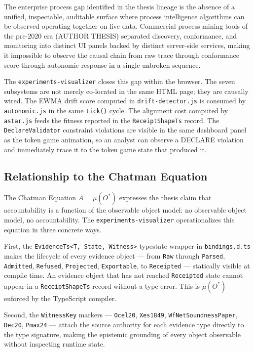The enterprise process gap identified in the thesis lineage is the absence of a unified,
inspectable, auditable surface where process intelligence algorithms can be observed operating
together on live data. Commercial process mining tools of the pre-2020 era (AUTHOR THESIS)
separated discovery, conformance, and monitoring into distinct UI panels backed by distinct
server-side services, making it impossible to observe the causal chain from raw trace through
conformance score through autonomic response in a single unbroken sequence.

The \texttt{experiments-visualizer} closes this gap within the browser. The seven subsystems
are not merely co-located in the same HTML page; they are causally wired. The EWMA drift score
computed in \texttt{drift-detector.js} is consumed by \texttt{autonomic.js} in the same
\texttt{tick()} cycle. The alignment cost computed by \texttt{astar.js} feeds the fitness
reported in the \texttt{ReceiptShapeTs} record. The \texttt{DeclareValidator} constraint
violations are visible in the same dashboard panel as the token game animation, so an analyst
can observe a DECLARE violation and immediately trace it to the token game state that produced it.

\subsection{Relationship to the Chatman Equation}
\label{sec:experiments-visualizer-lineage-chatman-eq}

The Chatman Equation $A = \mu(O^*)$ expresses the thesis claim that accountability is a
function of the observable object model: no observable object model, no accountability. The
\texttt{experiments-visualizer} operationalizes this equation in three concrete ways.

First, the \texttt{EvidenceTs<T, State, Witness>} typestate wrapper in \texttt{bindings.d.ts}
makes the lifecycle of every evidence object — from \texttt{Raw} through \texttt{Parsed},
\texttt{Admitted}, \texttt{Refused}, \texttt{Projected}, \texttt{Exportable}, to
\texttt{Receipted} — statically visible at compile time. An evidence object that has not reached
\texttt{Receipted} state cannot appear in a \texttt{ReceiptShapeTs} record without a type error.
This is $\mu(O^*)$ enforced by the TypeScript compiler.

Second, the \texttt{WitnessKey} markers — \texttt{Ocel20}, \texttt{Xes1849},
\texttt{WfNetSoundnessPaper}, \texttt{Dec20}, \texttt{Pmax24} — attach the source authority
for each evidence type directly to the type signature, making the epistemic grounding of every
object observable without inspecting runtime state.

